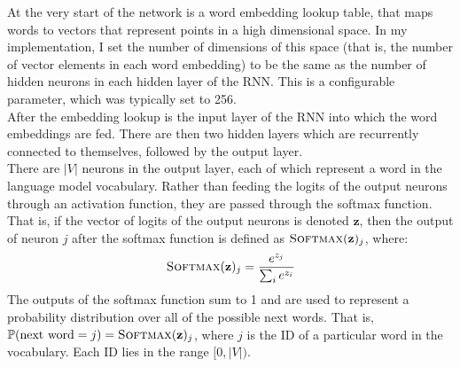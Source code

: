 \documentclass[a4paper, 12pt]{report}
\begin{document}
At the very start of the network is a word embedding lookup table, that maps words to vectors that represent points in a high dimensional space. In my implementation, I set the number of dimensions of this space (that is, the number of vector elements in each word embedding) to be the same as the number of hidden neurons in each hidden layer of the RNN. This is a configurable parameter, which was typically set to 256. \\

After the embedding lookup is the input layer of the RNN into which the word embeddings are fed. There are then two hidden layers which are recurrently connected to themselves, followed by the output layer. \\

There are $|V|$ neurons in the output layer, each of which represent a word in the language model vocabulary. Rather than feeding the logits of the output neurons through an activation function, they are passed through the softmax function. That is, if the vector of logits of the output neurons is denoted $\mathbf{z}$, then the output of neuron $j$ after the softmax function is defined as $\text{\scshape Softmax}(\mathbf{z})_j$, where:
\begin{gather}
	\text{\scshape Softmax}(\mathbf{z})_j = \frac{e^{z_j}}{\sum_i e^{z_i}}
\end{gather}
The outputs of the softmax function sum to 1 and are used to represent a probability distribution over all of the possible next words. That is, $\mathbb{P}(\text{next word} = j) = \text{\scshape Softmax}(\mathbf{z})_j$, where $j$ is the ID of a particular word in the vocabulary. Each ID lies in the range $[0, |V|)$.
\end{document}
